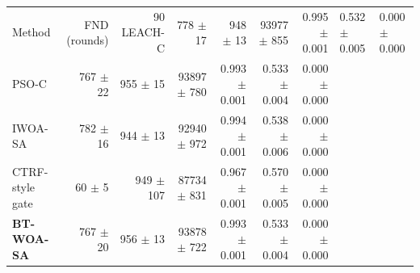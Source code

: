 \begin{tabular}{lrrrrrr}
\toprule
Method & FND (rounds) & 90 %
\midrule
LEACH-C & 778 $\pm$ 17 & 948 $\pm$ 13 & 93977 $\pm$ 855 & 0.995 $\pm$ 0.001 & 0.532 $\pm$ 0.005 & 0.000 $\pm$ 0.000 \\
PSO-C & 767 $\pm$ 22 & 955 $\pm$ 15 & 93897 $\pm$ 780 & 0.993 $\pm$ 0.001 & 0.533 $\pm$ 0.004 & 0.000 $\pm$ 0.000 \\
IWOA-SA & 782 $\pm$ 16 & 944 $\pm$ 13 & 92940 $\pm$ 972 & 0.994 $\pm$ 0.001 & 0.538 $\pm$ 0.006 & 0.000 $\pm$ 0.000 \\
CTRF-style gate & 60 $\pm$ 5 & 949 $\pm$ 107 & 87734 $\pm$ 831 & 0.967 $\pm$ 0.001 & 0.570 $\pm$ 0.005 & 0.000 $\pm$ 0.000 \\
\textbf{BT-WOA-SA} & 767 $\pm$ 20 & 956 $\pm$ 13 & 93878 $\pm$ 722 & 0.993 $\pm$ 0.001 & 0.533 $\pm$ 0.004 & 0.000 $\pm$ 0.000 \\
\bottomrule
\end{tabular}